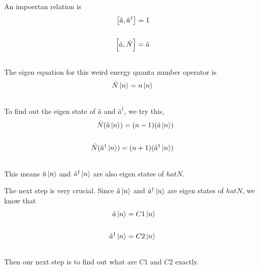 \documentclass[letterpaper,10pt,english]{sphinxmanual}
\begin{document}
An impoertan relation is
\begin{gather}
\begin{split}\left[\hat a, \hat a^\dagger\right] = 1 \\\\
\left[\hat a, \hat N\right] = \hat a\end{split}\notag\\\begin{split}\end{split}\notag
\end{gather}
The eigen equation for this weird energy quanta number operator is
\begin{gather}
\begin{split}\hat N \left| n\right\rangle = n \left| n\right\rangle\end{split}\notag\\\begin{split}\end{split}\notag
\end{gather}
To find out the eigen state of $\hat a$ and $\hat a^\dagger$, we try this,
\begin{gather}
\begin{split}\hat N (\hat a \left| n\right\rangle) = (n-1) (\hat a \left| n\right\rangle)  \\\\
\hat N (\hat a^\dagger \left| n\right\rangle) = (n+1) (\hat a^\dagger \left| n\right\rangle)\end{split}\notag\\\begin{split}\end{split}\notag
\end{gather}
This means $\hat a \left| n\right\rangle$ and $\hat a^\dagger \left| n\right\rangle$ are also eigen states of $hat N$.

The next step is very crucial. Since $\hat a \left| n\right\rangle$ and $\hat a^\dagger \left| n\right\rangle$ are eigen states of $hat N$, we know that
\begin{gather}
\begin{split}\hat a \left| n\right\rangle = C1 \left| n\right\rangle \\\\
\hat a^\dagger \left| n\right\rangle = C2 \left| n\right\rangle\end{split}\notag\\\begin{split}\end{split}\notag
\end{gather}
Then our next step is to find out what are $C1$ and $C2$ exactly.
\end{document}
